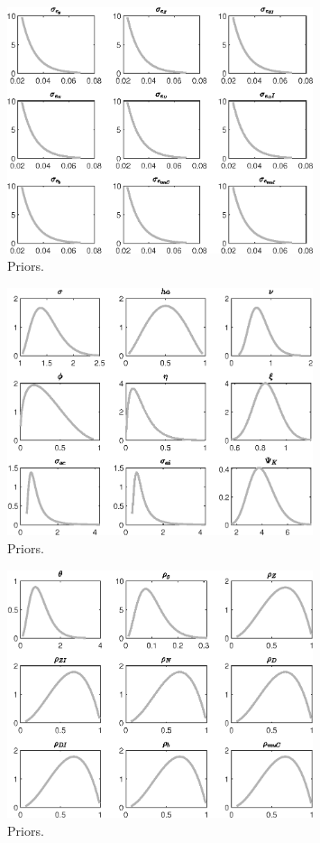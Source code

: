  
\begin{figure}[H]
\centering
\includegraphics[width=0.80\textwidth]{BRS_sectoral_wo_fixed_cost/graphs/BRS_sectoral_wo_fixed_cost_Priors1}
\caption{Priors.}\label{Fig:Priors:1}
\end{figure}
\begin{figure}[H]
\centering
\includegraphics[width=0.80\textwidth]{BRS_sectoral_wo_fixed_cost/graphs/BRS_sectoral_wo_fixed_cost_Priors2}
\caption{Priors.}\label{Fig:Priors:2}
\end{figure}
\begin{figure}[H]
\centering
\includegraphics[width=0.80\textwidth]{BRS_sectoral_wo_fixed_cost/graphs/BRS_sectoral_wo_fixed_cost_Priors3}
\caption{Priors.}\label{Fig:Priors:3}
\end{figure}
